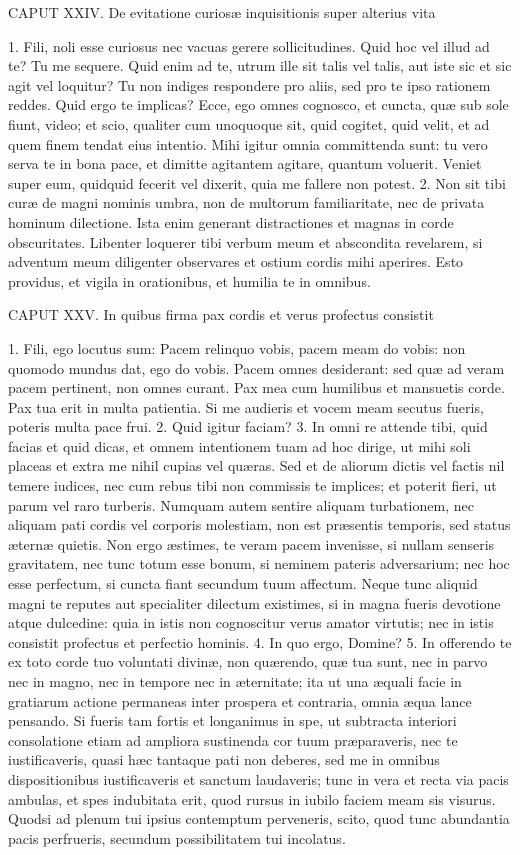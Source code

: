 CAPUT XXIV.
De evitatione curiosæ inquisitionis super alterius vita

1. Fili, noli esse curiosus nec vacuas gerere sollicitudines. Quid hoc vel illud ad te? Tu me sequere. Quid enim ad te, utrum ille sit talis vel talis, aut iste sic et sic agit vel loquitur? Tu non indiges respondere pro aliis, sed pro te ipso rationem reddes. Quid ergo te implicas? Ecce, ego omnes cognosco, et cuncta, quæ sub sole fiunt, video; et scio, qualiter cum unoquoque sit, quid cogitet, quid velit, et ad quem finem tendat eius intentio. Mihi igitur omnia committenda sunt: tu vero serva te in bona pace, et dimitte agitantem agitare, quantum voluerit. Veniet super eum, quidquid fecerit vel dixerit, quia me fallere non potest.
2. Non sit tibi curæ de magni nominis umbra, non de multorum familiaritate, nec de privata hominum dilectione. Ista enim generant distractiones et magnas in corde obscuritates. Libenter loquerer tibi verbum meum et abscondita revelarem, si adventum meum diligenter observares et ostium cordis mihi aperires. Esto providus, et vigila in orationibus, et humilia te in omnibus.


CAPUT XXV.
In quibus firma pax cordis et verus profectus consistit

1. Fili, ego locutus sum: Pacem relinquo vobis, pacem meam do vobis: non quomodo mundus dat, ego do vobis. Pacem omnes desiderant: sed quæ ad veram pacem pertinent, non omnes curant. Pax mea cum humilibus et mansuetis corde. Pax tua erit in multa patientia. Si me audieris et vocem meam secutus fueris, poteris multa pace frui.
2. Quid igitur faciam?
3. In omni re attende tibi, quid facias et quid dicas, et omnem intentionem tuam ad hoc dirige, ut mihi soli placeas et extra me nihil cupias vel quæras. Sed et de aliorum dictis vel factis nil temere iudices, nec cum rebus tibi non commissis te implices; et poterit fieri, ut parum vel raro turberis. Numquam autem sentire aliquam turbationem, nec aliquam pati cordis vel corporis molestiam, non est præsentis temporis, sed status æternæ quietis. Non ergo æstimes, te veram pacem invenisse, si nullam senseris gravitatem, nec tunc totum esse bonum, si neminem pateris adversarium; nec hoc esse perfectum, si cuncta fiant secundum tuum affectum. Neque tunc aliquid magni te reputes aut specialiter dilectum existimes, si in magna fueris devotione atque dulcedine: quia in istis non cognoscitur verus amator virtutis; nec in istis consistit profectus et perfectio hominis.
4. In quo ergo, Domine?
5. In offerendo te ex toto corde tuo voluntati divinæ, non quærendo, quæ tua sunt, nec in parvo nec in magno, nec in tempore nec in æternitate; ita ut una æquali facie in gratiarum actione permaneas inter prospera et contraria, omnia æqua lance pensando. Si fueris tam fortis et longanimus in spe, ut subtracta interiori consolatione etiam ad ampliora sustinenda cor tuum præparaveris, nec te iustificaveris, quasi hæc tantaque pati non deberes, sed me in omnibus dispositionibus iustificaveris et sanctum laudaveris; tunc in vera et recta via pacis ambulas, et spes indubitata erit, quod rursus in iubilo faciem meam sis visurus. Quodsi ad plenum tui ipsius contemptum perveneris, scito, quod tunc abundantia pacis perfrueris, secundum possibilitatem tui incolatus.


